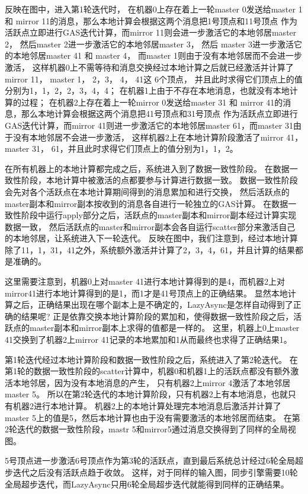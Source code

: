 反映在图中，进入第1轮迭代时，
在机器0上存在着上一轮master 0发送给master 1 和 mirror 11的消息，那么本地计算会根据这两个消息把1号顶点和11号顶点
作为活跃点立即进行GAS迭代计算，而mirror 11则会进一步激活它的本地邻居master 2，
然后master 2进一步激活它的本地邻居master 3， 然后 master 3进一步激活它的本地邻居master 41 和 master 4，
而master 1则由于没有本地邻居而不会进一步激活，
这样机器0上不需等待和消息交换经过本地计算之后就已经激活并计算了mirror 11， master 1， 2，3， 4， 41这 6个顶点，
并且此时求得它们顶点上的值分别为1，1，2，2，3，4，4；
在机器1上由于不存在本地消息，也就没有本地计算的过程；
在机器2上存在着上一轮mirror 0发送给master 31 和 mirror 41的消息，那么本地计算会根据这两个消息把41号顶点和31号顶点
作为活跃点立即进行GAS迭代计算，而mirror 41则进一步激活它的本地邻居master 61，而master 31由于没有本地邻居不会进一步激活，
这样机器2上在本地计算阶段激活了mirror 41， master 31， 61，并且此时求得它们顶点上的值分别为1，1，2。

在所有机器上的本地计算都完成之后，系统进入到了数据一致性阶段。
在数据一致性阶段，本地计算中被激活的点都要参与计算进行数据一致。
数据一致性阶段会先对各个活跃点在本地计算期间得到的消息累加和进行交换，
然后活跃点的master副本和mirror副本按收到的消息各自进行一轮独立的GAS计算。
在数据一致性阶段中运行apply部分之后，活跃点的master副本和mirror副本经过计算实现数据一致，
然后活跃点的master和mirror副本会各自运行scatter部分来激活自己的本地邻居，让系统进入下一轮迭代。
反映在图中，我们注意到，经过本地计算除了11，1，31，41之外，系统额外激活并计算了2，3，4，61，并且计算的结果都是准确的。

这里需要注意到，机器0上对master 41进行本地计算得到的是4，而机器2上对mirror41进行本地计算得到的是1，而1才是41号顶点上的正确结果。
显然本地计算之后，正确结果出现在哪个副本上是不确定的，LazyAsync是怎样自动得到了正确的结果呢? 
正是依靠交换本地计算阶段的累加和，使得数据一致性阶段之后，活跃点的master副本和mirror副本上求得的值都是一样的。
这里，机器上0上master 41交换到了机器2上mirror 41记录的本地累加和1从而最终也求得了正确结果1。

第1轮迭代经过本地计算阶段和数据一致性阶段之后，系统进入了第2轮迭代。
在第1轮的数据一致性阶段的scatter计算中，机器0和机器1上的活跃点都没有额外激活本地邻居，因为没有本地消息的产生，
只有机器2上mirror 4激活了本地邻居master 5。
所以在第2轮迭代的本地计算阶段，只有机器2上有本地消息，也就只有机器2进行本地计算。
机器2上的本地计算处理完本地消息后激活并计算了master 5上的值是5，然后本地计算也由于没有需要激活的本地邻居而结束。
在第2轮迭代的数据一致性阶段，mastr 5和mirror5通过消息交换得到了同样的全局视图。

5号顶点进一步激活6号顶点作为第3轮的活跃点，直到最后系统总计经过6轮全局超步迭代之后没有活跃点趋于收敛。
这样，对于同样的输入图，同步引擎需要10轮全局超步迭代，而LazyAsync只用6轮全局超步迭代就能得到同样的正确结果。



